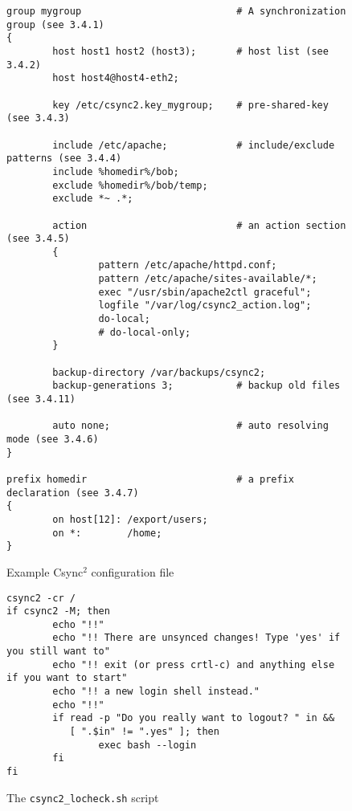 \documentclass[a4paper,twocolumn]{article}
\def\csync2{{\sc Csync$^{2}$}}
\begin{document}
\begin{figure*}[t]
  \begin{center}
\begin{verbatim}
group mygroup                           # A synchronization group (see 3.4.1)
{
        host host1 host2 (host3);       # host list (see 3.4.2)
        host host4@host4-eth2;

        key /etc/csync2.key_mygroup;    # pre-shared-key (see 3.4.3)

        include /etc/apache;            # include/exclude patterns (see 3.4.4)
        include %homedir%/bob;
        exclude %homedir%/bob/temp;
        exclude *~ .*;

        action                          # an action section (see 3.4.5)
        {
                pattern /etc/apache/httpd.conf;
                pattern /etc/apache/sites-available/*;
                exec "/usr/sbin/apache2ctl graceful";
                logfile "/var/log/csync2_action.log";
                do-local;
                # do-local-only;
        }

        backup-directory /var/backups/csync2;
        backup-generations 3;           # backup old files (see 3.4.11)

        auto none;                      # auto resolving mode (see 3.4.6)
}

prefix homedir                          # a prefix declaration (see 3.4.7)
{
        on host[12]: /export/users;
        on *:        /home;
}
\end{verbatim}
  \end{center}
  \caption{Example \csync2 configuration file}
\end{figure*}



\begin{figure*}[t]
  \begin{center}
\begin{verbatim}
csync2 -cr /
if csync2 -M; then
        echo "!!"
        echo "!! There are unsynced changes! Type 'yes' if you still want to"
        echo "!! exit (or press crtl-c) and anything else if you want to start"
        echo "!! a new login shell instead."
        echo "!!"
        if read -p "Do you really want to logout? " in &&
           [ ".$in" != ".yes" ]; then
                exec bash --login
        fi
fi
\end{verbatim}
  \end{center}
  \caption{The {\tt csync2\_locheck.sh} script}
\end{figure*}
\end{document}
